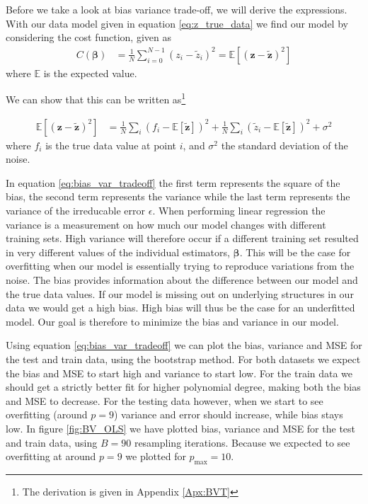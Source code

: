 \documentclass[reprint,english,notitlepage,aps,nobalancelastpage,nofootinbib]{revtex4-1}  %
\newcommand{\expz}{\mathbb{E}[\mathbf{\tilde{z}}]}
\begin{document}
Before we take a look at bias variance trade-off, we will derive the expressions. With our data model given in equation \eqref{eq:z_true_data} we find our model by considering the cost function, given as
\begin{align*}
  C(\bm{\beta}) &= \frac{1}{N} \sum_{i=0}^{N-1} (z_i - \tilde{z}_i)^2 = \mathbb{E}[(\mathbf{z}-\mathbf{\tilde{z}})^2]
\end{align*}
where $\mathbb{E}$ is the expected value. %

We can show that this can be written as\footnote{The derivation is given in Appendix \ref{Apx:BVT}}

\begin{align}
\label{eq:bias_var_tradeoff}
  \mathbb{E}[(\mathbf{z}-\mathbf{\tilde{z}})^2] &= \frac{1}{N}\sum_i (f_i - \expz)^2 + \frac{1}{N}\sum_i (\tilde{z}_i - \expz)^2 + \sigma^2
\end{align}
where $f_i$ is the true data value at point $i$, and $\sigma^2$ the standard deviation of the noise.

In equation \eqref{eq:bias_var_tradeoff} the first term represents the square of the bias, the second term represents the variance while the last term represents the variance of the irreducable error $\epsilon$. When performing linear regression the variance is a measurement on how much our model changes with different training sets. High variance will therefore occur if a different training set resulted in very different values of the individual estimators, $\bm{\beta}$. This will be the case for overfitting when our model is essentially trying to reproduce variations from the noise. The bias provides information about the difference between our model and the true data values. If our model is missing out on underlying structures in our data we would get a high bias. High bias will thus be the case for an underfitted model. Our goal is therefore to minimize the bias and variance in our model.

Using equation \eqref{eq:bias_var_tradeoff} we can plot the bias, variance and MSE for the test and train data, using the bootstrap method. For both datasets we expect the bias and MSE to start high and variance to start low. For the train data we should get a strictly better fit for higher polynomial degree, making both the bias and MSE to decrease. For the testing data however, when we start to see overfitting (around $p=9$) variance and error should increase, while bias stays low. In figure \ref{fig:BV_OLS} we have plotted bias, variance and MSE for the test and train data, using $B = 90$ resampling iterations. Because we expected to see overfitting at around $p=9$ we plotted for $p_\text{max} = 10$.
\end{document}
